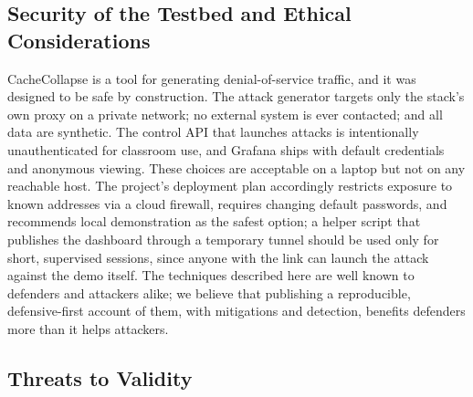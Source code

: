 \subsection{Security of the Testbed and Ethical Considerations}
\label{sec:ethics}
CacheCollapse is a tool for generating denial-of-service traffic, and it was designed
to be safe by construction. The attack generator targets only the stack's own proxy on
a private network; no external system is ever contacted; and all data are synthetic.
The control API that launches attacks is intentionally unauthenticated for classroom
use, and Grafana ships with default credentials and anonymous viewing. These choices
are acceptable on a laptop but not on any reachable host. The project's deployment
plan accordingly restricts exposure to known addresses via a cloud firewall, requires
changing default passwords, and recommends local demonstration as the safest option;
a helper script that publishes the dashboard through a temporary tunnel should be used
only for short, supervised sessions, since anyone with the link can launch the attack
against the demo itself. The techniques described here are well known to defenders and
attackers alike; we believe that publishing a reproducible, defensive-first account of
them, with mitigations and detection, benefits defenders more than it helps attackers.

\subsection{Threats to Validity}
\label{sec:validity}
